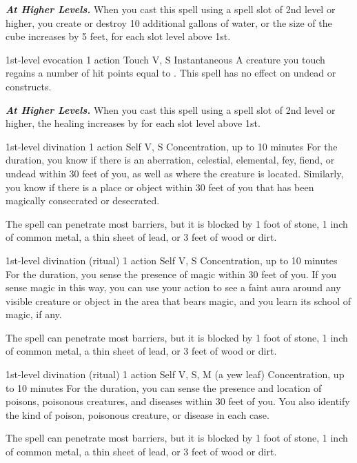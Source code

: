 \documentclass[10pt,twoside,twocolumn,openany]{book}
\newcommand{\castingModifier}{3}
\newcommand\impact[1]{
	\textbf{\textit{#1}}
}
\begin{document}
\impact{At Higher Levels.} When you cast this spell using a spell slot of 2nd level or higher, you create or destroy 10 additional gallons of water, or the size of the cube increases by 5 feet, for each slot level above 1st.

\newpage
{}
{1st-level evocation}
{\color{action} 1 action}
{Touch}
{V, S}
{Instantaneous}
%
A creature you touch regains a number of hit points equal to \dice{1d8 + \castingModifier}. This spell has no effect on undead or constructs.

\impact{At Higher Levels.} When you cast this spell using a spell slot of 2nd level or higher, the healing increases by
 for each slot level above 1st.

{1st-level divination}
{\color{action} 1 action}
{Self}
{V, S}
{{\color{concentration}Concentration}, up to 10 minutes}
%
For the duration, you know if there is an aberration, celestial, elemental, fey, fiend, or undead within 30 feet of you, as well as where the creature is located. Similarly, you know if there is a place or object within 30 feet of you that has been magically consecrated or desecrated.

The spell can penetrate most barriers, but it is blocked by 1 foot of stone, 1 inch of common metal, a thin sheet of lead, or 3 feet of wood or dirt.

{1st-level divination {\color{ritual}(ritual)}}
{\color{action} 1 action}
{Self}
{V, S}
{{\color{concentration}Concentration}, up to 10 minutes}
%
For the duration, you sense the presence of magic
within 30 feet of you. If you sense magic in this way, you can use your action to see a faint aura around any visible creature or object in the area that bears magic, and you learn its school of magic, if any.

The spell can penetrate most barriers, but it is blocked by 1 foot of stone, 1 inch of common metal, a thin sheet of lead, or 3 feet of wood or dirt.

{1st-level divination {\color{ritual}(ritual)}}
{\color{action} 1 action}
{Self}
{V, S, M (a yew leaf)}
{{\color{concentration}Concentration}, up to 10 minutes}
%
For the duration, you can sense the presence and location of poisons, poisonous creatures, and diseases within 30 feet of you. You also identify the kind of poison, poisonous creature, or disease in each case.

The spell can penetrate most barriers, but it is blocked by 1 foot of stone, 1 inch of common metal, a thin sheet of lead, or 3 feet of wood or dirt.
\end{document}
